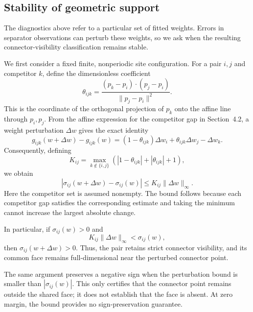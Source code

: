 \subsection{Stability of geometric support}
\label{subsec:geometric-stability}

The diagnostics above refer to a particular set of fitted weights. Errors in separator observations can perturb these weights, so we ask when the resulting connector-visibility classification remains stable.

We first consider a fixed finite, nonperiodic site configuration. For a pair $i,j$ and competitor $k$, define the dimensionless coefficient
\begin{equation}
\theta_{ijk}
=\frac{(p_k-p_i)\cdot(p_j-p_i)}
{\|p_j-p_i\|^2}.
\label{eq:stability-theta}
\end{equation}
This is the coordinate of the orthogonal projection of $p_k$ onto the affine line through $p_i,p_j$. From the affine expression for the competitor gap in Section~4.2, a weight perturbation $\Delta w$ gives the exact identity
\begin{equation}
g_{ijk}(w+\Delta w)-g_{ijk}(w)
=(1-\theta_{ijk})\Delta w_i
+\theta_{ijk}\Delta w_j-\Delta w_k.
\label{eq:gap-weight-perturbation}
\end{equation}
Consequently, defining
\begin{equation}
K_{ij}=
\max_{k\notin\{i,j\}}
\left(
|1-\theta_{ijk}|+|\theta_{ijk}|+1
\right),
\label{eq:gap-lipschitz-constant}
\end{equation}
we obtain
\begin{equation}
\boxed{
|\sigma_{ij}(w+\Delta w)-\sigma_{ij}(w)|
\le K_{ij}\|\Delta w\|_\infty.
}
\label{eq:gap-lipschitz-bound}
\end{equation}
Here the competitor set is assumed nonempty. The bound follows because each competitor gap satisfies the corresponding estimate and taking the minimum cannot increase the largest absolute change.

In particular, if $\sigma_{ij}(w)>0$ and
\begin{equation}
K_{ij}\|\Delta w\|_\infty<\sigma_{ij}(w),
\label{eq:strict-stability-condition}
\end{equation}
then $\sigma_{ij}(w+\Delta w)>0$. Thus, the pair retains strict connector visibility, and its common face remains full-dimensional near the perturbed connector point.

The same argument preserves a negative sign when the perturbation bound is smaller than $|\sigma_{ij}(w)|$. This only certifies that the connector point remains outside the shared face; it does not establish that the face is absent. At zero margin, the bound provides no sign-preservation guarantee.

